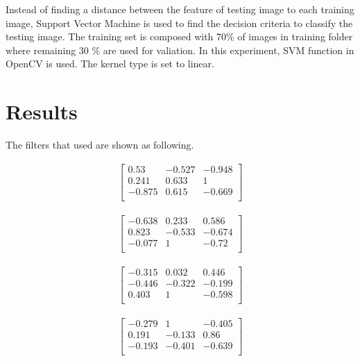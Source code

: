 \documentclass[11pt]{article}
\begin{document}
Instead of finding a distance between the feature of testing image to each training image, Support Vector Machine is used to find the decision criteria to classify the testing image. The training set is composed with 70$\%$ of images in training folder where remaining 30 $\%$ are used for valiation. In this experiment, SVM function in OpenCV is used. The kernel type is set to linear.


\section*{Results}

The filters that used are shown as following.


\begin{align*}
\begin{bmatrix}
0.53 & -0.527 & -0.948 \\ 
0.241 & 0.633  & 1\\ 
-0.875 &  0.615 & -0.669 \\
\end{bmatrix}
\end{align*}

\begin{align*}
\begin{bmatrix}
-0.638 &  0.233  & 0.586 \\ 
0.823 & -0.533 & -0.674\\ 
-0.077 &  1 &   -0.72 \\
\end{bmatrix}
\end{align*}

\begin{align*}
\begin{bmatrix}
-0.315 & 0.032 & 0.446 \\ 
-0.446 & -0.322 & -0.199\\ 
0.403 &  1 &  -0.598\\
\end{bmatrix}
\end{align*}

\begin{align*}
\begin{bmatrix}
-0.279 & 1  &  -0.405 \\ 
0.191 & -0.133 &  0.86\\ 
-0.193 & -0.401 & -0.639 \\
\end{bmatrix}
\end{align*}
\end{document}
